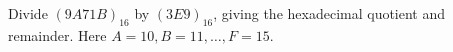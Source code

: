Divide $(9A71B)_{16}$ by $(3E9)_{16}$, giving the hexadecimal quotient and remainder. Here $ A=10,B=11,\ldots,F=15 $.
